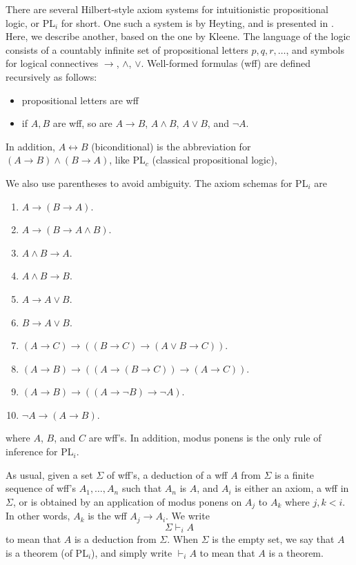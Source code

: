 \documentclass[12pt]{article}
\begin{document}
There are several Hilbert-style axiom systems for intuitionistic propositional logic, or PL$_i$ for short.  One such a system is by Heyting, and is presented in .  Here, we describe another, based on the one by Kleene.  The language of the logic consists of a countably infinite set of propositional letters $p,q,r,\ldots$, and symbols for logical connectives $\to$, $\land$, $\lor$.  Well-formed formulas (wff) are defined recursively as follows:
\begin{itemize}
\item propositional letters are wff
\item if $A,B$ are wff, so are $A\to B$, $A\land B$, $A\lor B$, and $\neg A$.
\end{itemize}
In addition, $A\leftrightarrow B$ (biconditional) is the abbreviation for $(A\to B) \land (B\to A)$, like PL$_c$ (classical propositional logic), 

We also use parentheses to avoid ambiguity.  The axiom schemas for PL$_i$ are
\begin{enumerate}
\item $A \to (B \to A)$.
\item $A \to (B \to A \land B)$.
\item $A \land B \to A$.
\item $A \land B \to B$.
\item $A \to A \lor B$.
\item $B \to A \lor B$.
\item $(A \to C) \to ((B \to C) \to (A \lor B \to C))$.
\item $(A \to B) \to ((A \to (B \to C)) \to (A \to C))$.
\item $(A \to B) \to ((A \to \neg B) \to \neg A)$.
\item $\neg A \to  (A \to B)$.
\end{enumerate}
where $A$, $B$, and $C$ are wff's.  In addition, modus ponens is the only rule of inference for PL$_i$.

As usual, given a set $\Sigma$ of wff's, a deduction of a wff $A$ from $\Sigma$ is a finite sequence of wff's $A_1,\ldots, A_n$ such that $A_n$ is $A$, and $A_i$ is either an axiom, a wff in $\Sigma$, or is obtained by an application of modus ponens on $A_j$ to $A_k$ where $j,k < i$.  In other words, $A_k$ is the wff $A_j \to A_i$.  We write $$\Sigma \vdash_i A$$ to mean that $A$ is a deduction from $\Sigma$.  When $\Sigma$ is the empty set, we say that $A$ is a theorem  (of PL$_i$), and simply write $\vdash_i A$ to mean that $A$ is a theorem.
\end{document}
